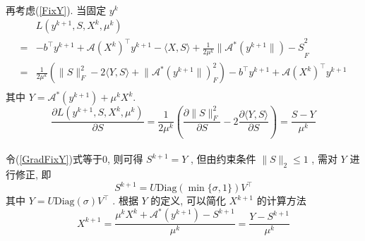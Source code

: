 \documentclass[UTF8]{ctexart}
\begin{document}
			\paragraph{}
				\quad 再考虑(\ref{FixY}). 当固定 $y^k$
				\begin{equation}
					\begin{split}\label{LagFixY}
							& L(y^{k + 1},S,X^k,\mu^k)\\
						=	& -b^\top y^{k + 1} + \mathcal{A}(X^k)^\top y^{k + 1} - \langle{X, S}\rangle + \frac{1}{2\mu^k} \lVert{\mathcal{A}^*(y^{k + 1}\rVert) - S}^2_F\\
						=	& \frac{1}{2\mu^k}(\lVert{S}\rVert_F^2 - 2\langle{Y, S}\rangle + \lVert{\mathcal{A}^*(y^{k + 1}\rVert)}_F^2) - b^\top y^{k + 1} + \mathcal{A}(X^k)^\top y^{k + 1}\\
					\end{split}
				\end{equation}
				其中 $Y = \mathcal{A}^*(y^{k + 1}) + \mu^k X^k$.
				\begin{equation}\label{GradFixY}
						\frac{\partial L(y^{k + 1},S,X^k,\mu^k)}{\partial S}
					=	\frac{1}{2\mu^k}(\frac{\partial \lVert{S}\rVert_F^2}{\partial S} - 2 \frac{\partial \langle{Y, S}\rangle}{\partial S})
					=	\frac{S - Y}{\mu^k}
				\end{equation}

			\paragraph{}
				\quad 令(\ref{GradFixY})式等于0, 则可得 $S^{k + 1} = Y$ , 但由约束条件 $\lVert{S}\rVert_2 \leq 1$ , 需对 $Y$ 进行修正, 即
				\begin{equation}\label{dualAS}
					S^{k + 1} = U \text{Diag}(\min \{\sigma, 1\}) V^\top
				\end{equation}
				其中 $Y = U \text{Diag}(\sigma) V^\top$ . 根据 $Y$ 的定义, 可以简化 $X^{k + 1}$ 的计算方法
				\begin{equation}\label{dualAX}
						X^{k + 1}
					=	\frac{\mu^kX^k + \mathcal{A}^*(y^{k + 1})-S^{k + 1}}{\mu^k}
					=	\frac{Y - S^{k + 1}}{\mu^k}
				\end{equation}
\end{document}
